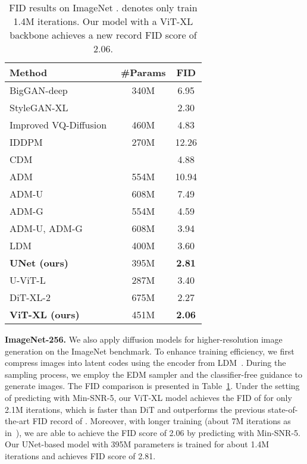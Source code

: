 \begin{table}[t]
\begin{center}
\begin{tabular}{ l c c }
\toprule
Method & \#Params & FID \\
\midrule
BigGAN-deep~\cite{brock2018biggan} & 340M & 6.95 \\
StyleGAN-XL~\cite{sauer2022styleganxl} & {} & 2.30 \\
\midrule
Improved VQ-Diffusion~\cite{gu2022vqdiffusion} & 460M & 4.83 \\
\midrule
IDDPM~\cite{nichol2021iddpm} & 270M &  12.26 \\
CDM~\cite{ho2022cdm} & {} &  4.88 \\
ADM~\cite{dhariwal2021adm} & 554M &  10.94 \\
ADM-U~\cite{dhariwal2021adm} & 608M &  7.49 \\
ADM-G~\cite{dhariwal2021adm} & 554M &  4.59 \\
ADM-U, ADM-G~\cite{dhariwal2021adm} & 608M &  3.94 \\
LDM~\cite{rombach2022ldm} & 400M & 3.60 \\
\textbf{UNet (ours)} & 395M & \textbf{2.81} \\
\midrule
U-ViT-L~\cite{bao2022uvit} & 287M &   3.40 \\
DiT-XL-2~\cite{peebles2022dit} & 675M &   2.27 \\
\textbf{ViT-XL (ours)} & 451M &   \textbf{2.06} \\
\bottomrule
\end{tabular}
\end{center}
\vspace{-5mm}
\caption{
FID results on ImageNet .  denotes only train 1.4M iterations. Our model with a ViT-XL backbone achieves a new record FID score of 2.06. 
}
\label{tab:in256}
\vspace{-3mm}
\end{table}


\noindent\textbf{ImageNet-256.}
We also apply diffusion models for higher-resolution image generation on the ImageNet  benchmark. To enhance training efficiency, we first compress  images into  latent codes using the encoder from LDM~\cite{rombach2022ldm}. During the sampling process, we employ the EDM sampler and the classifier-free guidance to generate images. 
The FID comparison is presented in Table~\ref{tab:in256}. 
Under the setting of predicting  with Min-SNR-5, our ViT-XL model achieves the FID of  for only 2.1M iterations, which is  faster than DiT and outperforms the previous state-of-the-art FID record of . 
Moreover, with longer training (about 7M iterations as in~\cite{peebles2022dit}), we are able to achieve the FID score of 2.06 by predicting  with Min-SNR-5.
Our UNet-based model with 395M parameters is trained for about 1.4M iterations and achieves FID score of 2.81.












%
